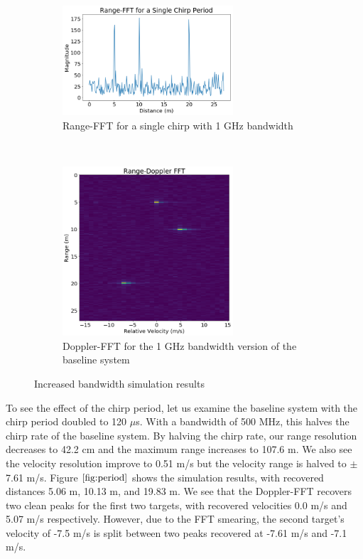 \begin{figure}[h]
	\centering 
	\begin{subfigure}[c]{0.5\textwidth}
		\centering
		\includegraphics[width=2.5in]{imgs/bandwidth_range}
		\caption{Range-FFT for a single chirp with 1 GHz bandwidth}
	\end{subfigure}%
	~
	\begin{subfigure}[c]{0.5\textwidth}
		\centering
		\includegraphics[width=2.5in]{imgs/bandwidth_doppler}
		\caption{Doppler-FFT for the 1 GHz bandwidth version of the
		baseline system}
	\end{subfigure}
	\caption{Increased bandwidth simulation results}
	\label{fig:bandwidth}
\end{figure}

To see the effect of the chirp period, let us examine the baseline system with
the chirp period doubled to 120 $\mu$s. With a bandwidth of 500 MHz, this halves
the chirp rate of the baseline system. By halving the chirp rate, our range
resolution decreases to 42.2 cm and the maximum range increases to 107.6 m. We
also see the velocity resolution improve to 0.51 m/s but the velocity range is
halved to $\pm$7.61 m/s. Figure $\ref{fig:period}$ shows the simulation
results, with recovered distances 5.06 m, 10.13 m, and 19.83 m. We see that the
Doppler-FFT recovers two clean peaks for the first two targets, with recovered
velocities 0.0 m/s and 5.07 m/s respectively. However, due to the FFT smearing, the second target's
velocity of -7.5 m/s is split between two peaks recovered at -7.61 m/s and -7.1
m/s.

